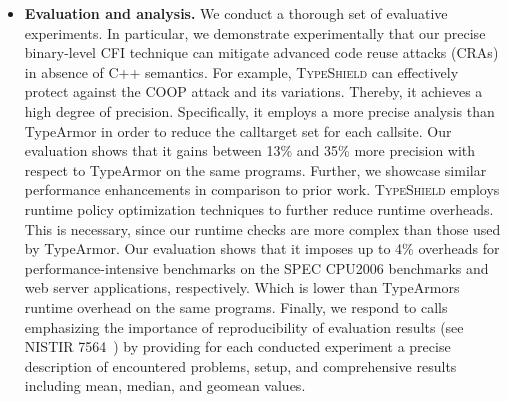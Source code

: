\begin{itemize}
 \item 
\textbf{Evaluation and analysis.} We conduct a thorough set of evaluative experiments. In particular, we demonstrate experimentally that our precise binary-level 
 CFI technique can mitigate advanced code reuse attacks (CRAs) in absence of C++ semantics. For example, \textsc{TypeShield} can effectively protect against 
 the COOP attack and its variations. Thereby, it achieves a high degree of precision. Specifically, it 
 employs a more precise analysis than TypeArmor in order to reduce the calltarget set for each callsite. Our evaluation shows that it
 gains between 13\% and 35\% more precision with respect to TypeArmor on the same programs. Further, we showcase similar {performance} enhancements in 
 comparison to prior work. \textsc{TypeShield} employs runtime policy optimization techniques to further reduce runtime overheads. This is necessary, since our 
 runtime checks are more complex than those
 used by TypeArmor. Our evaluation shows that it imposes up to 4\% overheads for performance-intensive benchmarks on the SPEC CPU2006 benchmarks and web 
 server applications, respectively. Which is lower than TypeArmors runtime overhead on the same programs.
 Finally, we respond to calls emphasizing the importance of reproducibility of evaluation results (see NISTIR 7564~\cite{reprod:nist}) by 
 providing for each conducted experiment a precise description of encountered problems, setup, and comprehensive results including mean, median, and geomean values.

\end{itemize}


% 

